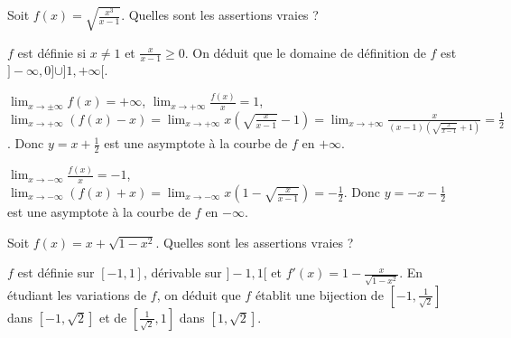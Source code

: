 \begin{question} 

Soit $f(x)=\sqrt{\frac{x^3}{x-1}}$.  Quelles sont les assertions vraies ?

\begin{answers}
    \good{Le domaine de définition de $f$ est $]-\infty, 0]\cup ]1,+\infty[$.}
         



  
\end{answers}
\begin{explanations}
$f$ est définie si $x\neq 1$ et $\frac{x}{x-1}\ge 0$. On déduit que le domaine de définition de $f$ est $]-\infty, 0]\cup ]1,+\infty[$.

$\lim_{x \to \pm \infty}f(x) = + \infty$,  $\lim_{x \to + \infty}\frac{f(x)}{x} = 1$, $\lim_{x \to + \infty}(f(x)-x) = \lim_{x \to + \infty}x(\sqrt{\frac{x}{x-1}}-1)= \lim_{x \to + \infty} \frac{x}{(x-1)(\sqrt{\frac{x}{x-1}}+1)}= \frac{1}{2}$. Donc $y=x+\frac{1}{2}$ est une asymptote à la courbe de $f$ en $+\infty$.

$\lim_{x \to - \infty}\frac{f(x)}{x} = -1$,  $\lim_{x \to - \infty}(f(x)+x) = \lim_{x \to - \infty}x(1-\sqrt{\frac{x}{x-1}})= -\frac{1}{2}$. Donc $y=-x-  \frac{1}{2}$ est une asymptote à la courbe de $f$ en $-\infty$.
\end{explanations}


\end{question}




\begin{question} 

Soit $f(x)=x+ \sqrt{ 1-x^2}$.  Quelles sont les assertions vraies ?

\begin{answers}



\end{answers}
\begin{explanations}
$f$ est définie sur $[-1,1]$, dérivable sur $]-1,1[$ et $f'(x)= 1-\frac{x}{\sqrt{1-x^2}}$. En étudiant les variations de $f$, on déduit que $f$ établit une bijection de $[-1,\frac{1}{\sqrt 2}]$ dans $[-1,\sqrt 2]$ et de $[\frac{1}{\sqrt 2}, 1]$  dans $[1,\sqrt 2]$.
\end{explanations}


\end{question}




